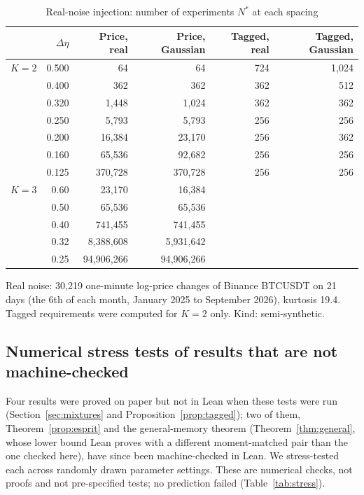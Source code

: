 \documentclass[12pt]{article}
\theoremstyle{definition}
\theoremstyle{remark}
\begin{document}
\begin{table}[!htbp]\centering\small
\begin{threeparttable}
\caption{Real-noise injection: number of experiments $N^*$ at each spacing}\label{tab:injectionfull}
\begin{tabular}{lrrrrr}
\toprule
 & $\Delta\eta$ & Price, real & Price, Gaussian & Tagged, real & Tagged, Gaussian\\
\midrule
$K=2$ & 0.500 & 64 & 64 & 724 & 1{,}024\\
 & 0.400 & 362 & 362 & 362 & 512\\
 & 0.320 & 1{,}448 & 1{,}024 & 362 & 362\\
 & 0.250 & 5{,}793 & 5{,}793 & 256 & 256\\
 & 0.200 & 16{,}384 & 23{,}170 & 256 & 362\\
 & 0.160 & 65{,}536 & 92{,}682 & 256 & 256\\
 & 0.125 & 370{,}728 & 370{,}728 & 256 & 256\\
\midrule
$K=3$ & 0.60 & 23{,}170 & 16{,}384 & & \\
 & 0.50 & 65{,}536 & 65{,}536 & & \\
 & 0.40 & 741{,}455 & 741{,}455 & & \\
 & 0.32 & 8{,}388{,}608 & 5{,}931{,}642 & & \\
 & 0.25 & 94{,}906{,}266 & 94{,}906{,}266 & & \\
\bottomrule
\end{tabular}
\begin{tablenotes}\footnotesize\item Real noise: 30{,}219 one-minute log-price changes of Binance BTCUSDT on 21 days (the 6th of each month, January 2025 to September 2026), kurtosis 19.4. Tagged requirements were computed for $K=2$ only. Kind: semi-synthetic.\end{tablenotes}
\end{threeparttable}
\end{table}

\subsection{Numerical stress tests of results that are not machine-checked}\label{app:stress}

Four results were proved on paper but not in Lean when these tests were run (Section~\ref{sec:mixtures} and Proposition~\ref{prop:tagged}); two of them, Theorem~\ref{prop:esprit} and the general-memory theorem (Theorem~\ref{thm:general}, whose lower bound Lean proves with a different moment-matched pair than the one checked here), have since been machine-checked in Lean. We stress-tested each across randomly drawn parameter settings. These are numerical checks, not proofs and not pre-specified tests; no prediction failed (Table~\ref{tab:stress}).
\end{document}
